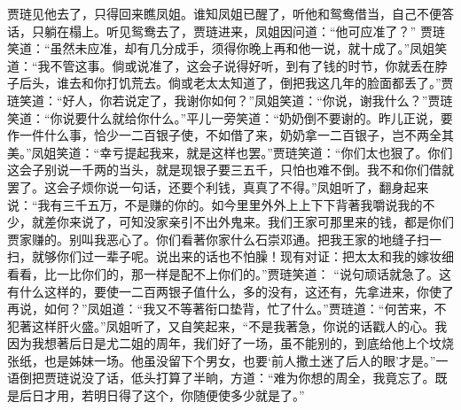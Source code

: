 \begin{parag}
    贾琏见他去了，只得回来瞧凤姐。谁知凤姐已醒了，听他和鸳鸯借当，自己不便答话，只躺在榻上。听见鸳鸯去了，贾琏进来，凤姐因问道：“他可应准了？” 贾琏笑道：“虽然未应准，却有几分成手，须得你晚上再和他一说，就十成了。”凤姐笑道：“我不管这事。倘或说准了，这会子说得好听，到有了钱的时节，你就丢在脖子后头，谁去和你打饥荒去。倘或老太太知道了，倒把我这几年的脸面都丢了。”贾琏笑道：“好人，你若说定了，我谢你如何？”凤姐笑道：“你说，谢我什么？”贾琏笑道：“你说要什么就给你什么。”平儿一旁笑道：“奶奶倒不要谢的。昨儿正说，要作一件什么事，恰少一二百银子使，不如借了来，奶奶拿一二百银子，岂不两全其美。”凤姐笑道：“幸亏提起我来，就是这样也罢。”贾琏笑道：“你们太也狠了。你们这会子别说一千两的当头，就是现银子要三五千，只怕也难不倒。我不和你们借就罢了。这会子烦你说一句话，还要个利钱，真真了不得。”凤姐听了，翻身起来说：“我有三千五万，不是赚的你的。如今里里外外上上下下背著我嚼说我的不少，就差你来说了，可知没家亲引不出外鬼来。我们王家可那里来的钱，都是你们贾家赚的。别叫我恶心了。你们看著你家什么石崇邓通。把我王家的地缝子扫一扫，就够你们过一辈子呢。说出来的话也不怕臊！现有对证：把太太和我的嫁妆细看看，比一比你们的，那一样是配不上你们的。”贾琏笑道： “说句顽话就急了。这有什么这样的，要使一二百两银子值什么，多的没有，这还有，先拿进来，你使了再说，如何？”凤姐道：“我又不等著衔口垫背，忙了什么。”贾琏道：“何苦来，不犯著这样肝火盛。”凤姐听了，又自笑起来，“不是我著急，你说的话戳人的心。我因为我想著后日是尤二姐的周年，我们好了一场，虽不能别的，到底给他上个坟烧张纸，也是姊妹一场。他虽没留下个男女，也要‘前人撒土迷了后人的眼’才是。”一语倒把贾琏说没了话，低头打算了半晌，方道：“难为你想的周全，我竟忘了。既是后日才用，若明日得了这个，你随便使多少就是了。”
\end{parag}


